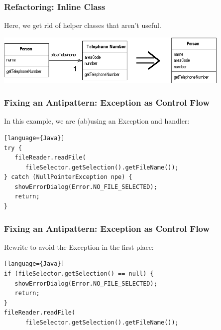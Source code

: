 \begin{frame}
\frametitle{Refactoring: Inline Class}
\begin{changemargin}{1cm}

Here, we get rid of helper classes that aren't useful.

\begin{center}
\includegraphics[width=0.85\textwidth]{images/inlineClass.png}
\end{center}




\end{changemargin}
\end{frame}

\begin{frame}[fragile]
\frametitle{Fixing an Antipattern: Exception as Control Flow}
\begin{changemargin}{1cm}

In this example, we are (ab)using an Exception and handler:

\begin{verbatim}[language={Java}]
try {
   fileReader.readFile(
      fileSelector.getSelection().getFileName());
} catch (NullPointerException npe) {
   showErrorDialog(Error.NO_FILE_SELECTED);
   return;
}
\end{verbatim} 
\end{changemargin}
\end{frame}

\begin{frame}[fragile]
\frametitle{Fixing an Antipattern: Exception as Control Flow}
\begin{changemargin}{1cm}

Rewrite to avoid the Exception in the first place:

\begin{verbatim}[language={Java}]
if (fileSelector.getSelection() == null) {
   showErrorDialog(Error.NO_FILE_SELECTED);
   return;
}
fileReader.readFile(
      fileSelector.getSelection().getFileName());
\end{verbatim} 
\end{changemargin}
\end{frame}

